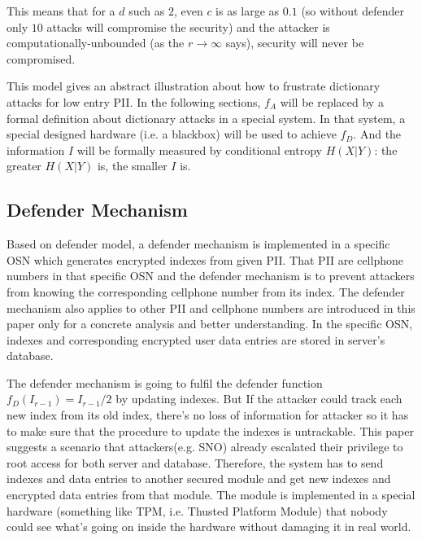 \documentclass[10pt, conference, compsocconf]{IEEEtran}
\begin{document}
        This means that for a $d$ such as $2$, even $c$ is as large as
        $0.1$ (so without defender only $10$ attacks will compromise
        the security) and the attacker is computationally-unbounded
        (as the $r \rightarrow \infty$ says), security will
        never be compromised.
        
        This model gives an abstract illustration about how to frustrate
        dictionary attacks for low entry PII.
        In the following sections, $f_A$ will be replaced by a formal definition
       	about dictionary attacks in a special system.
        In that system, a special designed hardware (i.e. a blackbox) 
        will be used to achieve $f_D$.
        And the information $I$ will be formally
        measured by conditional entropy $H(X|Y)$: the greater $H(X|Y)$
        is, the smaller $I$ is.

    \subsection{Defender Mechanism}\label{sec_ds}
        Based on defender model, a defender mechanism is implemented
        in a specific OSN
        which generates encrypted indexes
        from given PII. That PII are cellphone numbers
        in that specific OSN and the defender mechanism is to prevent attackers
        from knowing the corresponding cellphone number from its index.
        The defender mechanism also applies to other PII and cellphone numbers are introduced
        in this paper only for a concrete analysis and better understanding.
        In the specific OSN, indexes and corresponding encrypted user data entries are stored
        in server's database.

        The defender mechanism is going to fulfil the defender
        function $f_D(I_{r-1}) = I_{r-1}/2$ by updating indexes.
        But If the attacker
        could track each new index from its old index, there's no loss of information
        for attacker so it has to make sure that the procedure to update the indexes
        is untrackable.
        This paper suggests a scenario that attackers(e.g. SNO) already
        escalated their privilege to root access for
        both server and database. Therefore, the system has to send
        indexes and data entries to another
        secured module and get new indexes and encrypted data
        entries from that module.
        The module is implemented in a special hardware (something
        like TPM, i.e. Thusted Platform Module) that nobody
        could see what's going on inside the hardware without damaging it in real world.
\end{document}
